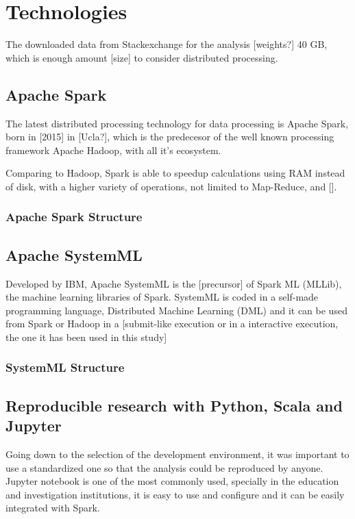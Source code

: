 \documentclass[11pt]{article} %
\begin{document}
\section{Technologies}

The downloaded data from Stackexchange for the analysis [weights?] 40 GB, which is enough amount [size] to consider distributed processing.

\subsection{Apache Spark}

The latest distributed processing technology for data processing is Apache Spark, born in [2015] in [Ucla?], which is the predecesor of the well known processing framework Apache Hadoop, with all it's ecosystem.

Comparing to Hadoop, Spark is able to speedup calculations using RAM instead of disk, with a higher variety of operations, not limited to Map-Reduce,  and [].

\subsubsection{Apache Spark Structure}




\subsection{Apache SystemML}

Developed by IBM, Apache SystemML is the [precursor] of Spark ML (MLLib), the machine learning libraries of Spark.
SystemML is coded in a self-made programming language, Distributed Machine Learning (DML) and it can be used from Spark or Hadoop in a [submit-like execution or in a interactive execution, the one it has been used in this study]

\subsubsection{SystemML Structure}



\subsection{Reproducible research with Python, Scala and Jupyter}

Going down to the selection of the development environment, it was important to use a standardized one so that the analysis could be reproduced by anyone. Jupyter notebook is one of the most commonly used, specially in the education and investigation institutions, it is easy to use and configure and it can be easily integrated with Spark.
\end{document}
